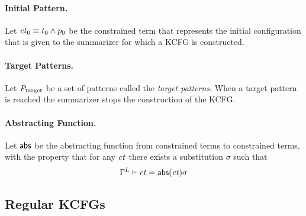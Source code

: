 \documentclass{article}
\begin{document}
\paragraph{Initial Pattern.}
Let $\mathit{ct}_0 \equiv t_0 \land p_0$ be the constrained term that represents the initial configuration
that is given to the \K summarizer for which a KCFG is constructed. 

\paragraph{Target Patterns.}

Let $P_\text{target}$ be a set of patterns called the \emph{target patterns}. 
When a target pattern is reached the \K summarizer stops the construction of the KCFG. 

\paragraph{Abstracting Function.}

Let $\mathsf{abs}$ be the abstracting function
from constrained terms to constrained terms, with the property that
for any $\mathit{ct}$ there exists  a substitution $\sigma$ such that
\[\Gamma^L \vdash \mathit{ct} = \mathsf{abs}(\mathit{ct})\sigma\]

\subsection{Regular KCFGs}
\end{document}
